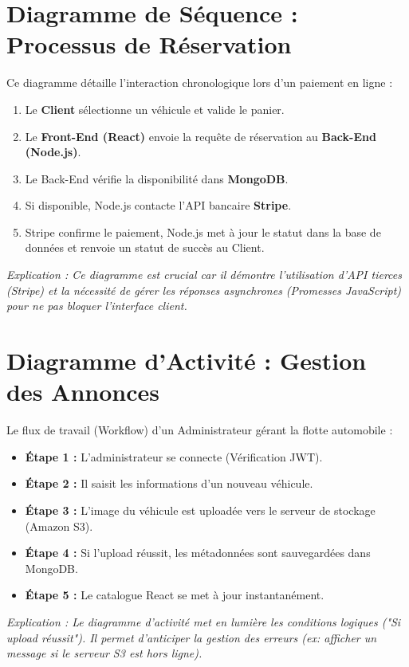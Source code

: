 \documentclass[12pt, a4paper]{report}
\begin{document}
\section{Diagramme de Séquence : Processus de Réservation}
Ce diagramme détaille l'interaction chronologique lors d'un paiement en ligne :
\begin{enumerate}
    \item Le \textbf{Client} sélectionne un véhicule et valide le panier.
    \item Le \textbf{Front-End (React)} envoie la requête de réservation au \textbf{Back-End (Node.js)}.
    \item Le Back-End vérifie la disponibilité dans \textbf{MongoDB}.
    \item Si disponible, Node.js contacte l'API bancaire \textbf{Stripe}.
    \item Stripe confirme le paiement, Node.js met à jour le statut dans la base de données et renvoie un statut de succès au Client.
\end{enumerate}
\textit{Explication : Ce diagramme est crucial car il démontre l'utilisation d'API tierces (Stripe) et la nécessité de gérer les réponses asynchrones (Promesses JavaScript) pour ne pas bloquer l'interface client.}

\section{Diagramme d'Activité : Gestion des Annonces}
Le flux de travail (Workflow) d'un Administrateur gérant la flotte automobile :
\begin{itemize}
    \item \textbf{Étape 1 :} L'administrateur se connecte (Vérification JWT).
    \item \textbf{Étape 2 :} Il saisit les informations d'un nouveau véhicule.
    \item \textbf{Étape 3 :} L'image du véhicule est uploadée vers le serveur de stockage (Amazon S3).
    \item \textbf{Étape 4 :} Si l'upload réussit, les métadonnées sont sauvegardées dans MongoDB.
    \item \textbf{Étape 5 :} Le catalogue React se met à jour instantanément.
\end{itemize}
\textit{Explication : Le diagramme d'activité met en lumière les conditions logiques ("Si upload réussit"). Il permet d'anticiper la gestion des erreurs (ex: afficher un message si le serveur S3 est hors ligne).}
\end{document}
